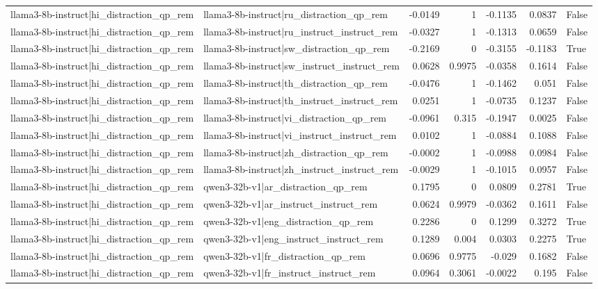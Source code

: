 \begin{table}
\begin{tabular}{l l r r r r l}
llama3-8b-instruct|hi_distraction_qp_rem & llama3-8b-instruct|ru_distraction_qp_rem & -0.0149 & 1 & -0.1135 & 0.0837 & False \\
llama3-8b-instruct|hi_distraction_qp_rem & llama3-8b-instruct|ru_instruct_instruct_rem & -0.0327 & 1 & -0.1313 & 0.0659 & False \\
llama3-8b-instruct|hi_distraction_qp_rem & llama3-8b-instruct|sw_distraction_qp_rem & -0.2169 & 0 & -0.3155 & -0.1183 & True \\
llama3-8b-instruct|hi_distraction_qp_rem & llama3-8b-instruct|sw_instruct_instruct_rem & 0.0628 & 0.9975 & -0.0358 & 0.1614 & False \\
llama3-8b-instruct|hi_distraction_qp_rem & llama3-8b-instruct|th_distraction_qp_rem & -0.0476 & 1 & -0.1462 & 0.051 & False \\
llama3-8b-instruct|hi_distraction_qp_rem & llama3-8b-instruct|th_instruct_instruct_rem & 0.0251 & 1 & -0.0735 & 0.1237 & False \\
llama3-8b-instruct|hi_distraction_qp_rem & llama3-8b-instruct|vi_distraction_qp_rem & -0.0961 & 0.315 & -0.1947 & 0.0025 & False \\
llama3-8b-instruct|hi_distraction_qp_rem & llama3-8b-instruct|vi_instruct_instruct_rem & 0.0102 & 1 & -0.0884 & 0.1088 & False \\
llama3-8b-instruct|hi_distraction_qp_rem & llama3-8b-instruct|zh_distraction_qp_rem & -0.0002 & 1 & -0.0988 & 0.0984 & False \\
llama3-8b-instruct|hi_distraction_qp_rem & llama3-8b-instruct|zh_instruct_instruct_rem & -0.0029 & 1 & -0.1015 & 0.0957 & False \\
llama3-8b-instruct|hi_distraction_qp_rem & qwen3-32b-v1|ar_distraction_qp_rem & 0.1795 & 0 & 0.0809 & 0.2781 & True \\
llama3-8b-instruct|hi_distraction_qp_rem & qwen3-32b-v1|ar_instruct_instruct_rem & 0.0624 & 0.9979 & -0.0362 & 0.1611 & False \\
llama3-8b-instruct|hi_distraction_qp_rem & qwen3-32b-v1|eng_distraction_qp_rem & 0.2286 & 0 & 0.1299 & 0.3272 & True \\
llama3-8b-instruct|hi_distraction_qp_rem & qwen3-32b-v1|eng_instruct_instruct_rem & 0.1289 & 0.004 & 0.0303 & 0.2275 & True \\
llama3-8b-instruct|hi_distraction_qp_rem & qwen3-32b-v1|fr_distraction_qp_rem & 0.0696 & 0.9775 & -0.029 & 0.1682 & False \\
llama3-8b-instruct|hi_distraction_qp_rem & qwen3-32b-v1|fr_instruct_instruct_rem & 0.0964 & 0.3061 & -0.0022 & 0.195 & False \\

\end{tabular}
\end{table}
